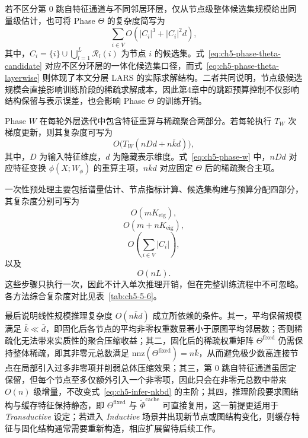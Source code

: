 若不区分第 $0$ 跳自特征通道与不同邻居环层，仅从节点级整体候选集规模给出同量级估计，也可将 Phase $\Theta$ 的复杂度简写为
\begin{equation}
  \sum_{i\in V}
  O\!\left(|C_i|^3 + |C_i|^2 d\right),
  \label{eq:ch5-phase-theta-candidate}
\end{equation}
其中，$C_i=\{i\}\cup\bigcup_{l=1}^{L}\mathcal{R}_l(i)$ 为节点 $i$ 的候选集。式~\eqref{eq:ch5-phase-theta-candidate} 对应不区分环层的一体化候选集口径，而式~\eqref{eq:ch5-phase-theta-layerwise} 则体现了本文分层 LARS 的实际求解结构。二者共同说明，节点级候选规模会直接影响训练阶段的稀疏求解成本，因此第4章中的跳距预算控制不仅影响结构保留与表示误差，也会影响 Phase $\Theta$ 的训练开销。

Phase $W$ 在每轮外层迭代中包含特征重算与稀疏聚合两部分。若每轮执行 $T_W$ 次梯度更新，则其复杂度可写为
\begin{equation}
  O\!\bigl(T_W(nDd+n\bar{k}d)\bigr),
  \label{eq:ch5-phase-w}
\end{equation}
其中，$D$ 为输入特征维度，$d$ 为隐藏表示维度。式~\eqref{eq:ch5-phase-w} 中，$nDd$ 对应特征变换 $\phi(X;W_\phi)$ 的重算主项，$n\bar{k}d$ 对应固定 $\Theta$ 后的稀疏聚合主项。

一次性预处理主要包括谱量估计、节点指标计算、候选集构建与预算分配四部分，其复杂度分别可写为
\begin{equation}
  O(mK_{\text{eig}}),
  \label{eq:ch5-pre-spec}
\end{equation}
\begin{equation}
  O(m+nK_{\text{eig}}),
  \label{eq:ch5-pre-index}
\end{equation}
\begin{equation}
  O\!\left(\sum_{i\in V}|C_i|\right),
  \label{eq:ch5-pre-candidate}
\end{equation}
以及
\begin{equation}
  O(nL).
  \label{eq:ch5-pre-budget}
\end{equation}
这些步骤只执行一次，因此不计入单次推理开销，但在完整训练流程中不可忽略。各方法综合复杂度对比见表~\ref{tab:ch5-5-6}。

最后说明线性规模推理复杂度 $O(n\bar{k}d)$ 成立所依赖的条件。其一，平均保留规模满足 $\bar{k}\ll\bar{d}$，即固化后各节点的平均非零权重数显著小于原图平均邻居数；否则稀疏化无法带来实质性的聚合压缩收益；其二，固化后的稀疏权重矩阵 $\Theta^{\text{fixed}}$ 仍需保持整体稀疏，即其非零元总数满足 $\mathrm{nnz}(\Theta^{\text{fixed}})=n\bar{k}$，从而避免极少数高连接节点在局部引入过多非零项并削弱总体压缩效果；其三，第 $0$ 跳自特征通道虽固定保留，但每个节点至多仅额外引入一个非零项，因此只会在非零元总数中带来 $O(n)$ 级增量，不改变式~\eqref{eq:ch5-infer-nkbd} 的主阶；其四，推理阶段要求图结构与缓存特征保持静态，即 $\Theta^{\text{fixed}}$ 与 $\tilde{\Phi}^{\text{cache}}$ 可直接复用，这一前提更适用于 \emph{Transductive} 设定；若进入 \emph{Inductive} 场景并出现新节点或图结构变化，则缓存特征与固化结构通常需要重新构造，相应扩展留待后续工作。

